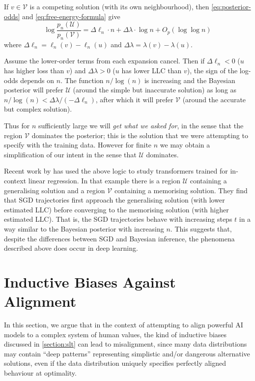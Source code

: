 If $v \in \mathcal{V}$ is a competing solution (with its own neighbourhood), then \cref{eq:posterior-odds} and \cref{eq:free-energy-formula} give
\begin{equation}\label{eq:trade-off}
    \log\frac{p_n(\mathcal{U})}{p_n(\mathcal{V})}
    = \Delta\ell_n \cdot n 
      + \Delta\lambda \cdot \log n
      + O_p(\log\log n)
\end{equation}
where $\Delta\ell_n = \ell_n(v) - \ell_n(u)$ and $\Delta\lambda = \lambda(v) - \lambda(u)$.

Assume the lower-order terms from each expansion cancel.
Then
    if $\Delta\ell_n < 0$ ($u$ has higher loss than $v$)
    and $\Delta\lambda > 0$ ($u$ has lower LLC than $v$),
the sign of the log-odds depends on $n$.
% 
The function $n / \log(n)$ is increasing and the Bayesian posterior will prefer
    $\mathcal{U}$ (around the simple but inaccurate solution)
as long as $n / \log(n) < \Delta \lambda / (-\Delta\ell_n)$,
after which it will prefer $\mathcal{V}$ (around the accurate but complex solution).

Thus for $n$ sufficiently large we will \emph{get what we asked for}, in the sense that the region $\mathcal{V}$ dominates the posterior; this is the solution that we were attempting to specify with the training data. However for finite $n$ we may obtain a simplification of our intent in the sense that $\mathcal{U}$ dominates.

Recent work by \citet{carroll2025dynamicstransientstructureincontext} has used the above logic to study transformers trained for in-context linear regression. In that example there is a region $\mathcal{U}$ containing a generalising solution and a region $\mathcal{V}$ containing a memorising solution. They find that SGD trajectories first approach the generalising solution (with lower estimated LLC) before converging to the memorising solution (with higher estimated LLC). That is, the SGD trajectories behave with increasing steps $t$ in a way similar to the Bayesian posterior with increasing $n$. This suggests that, despite the differences between SGD and Bayesian inference, the phenomena described above does occur in deep learning.

\section{Inductive Biases Against Alignment}\label{section:risks}

In this section, we argue that in the context of attempting to align powerful AI models to a complex system of human values, the kind of inductive biases discussed in \cref{section:slt} can lead to misalignment, since many data distributions may contain ``deep patterns'' representing simplistic and/or dangerous alternative solutions, even if the data distribution uniquely specifies perfectly aligned behaviour at optimality.


